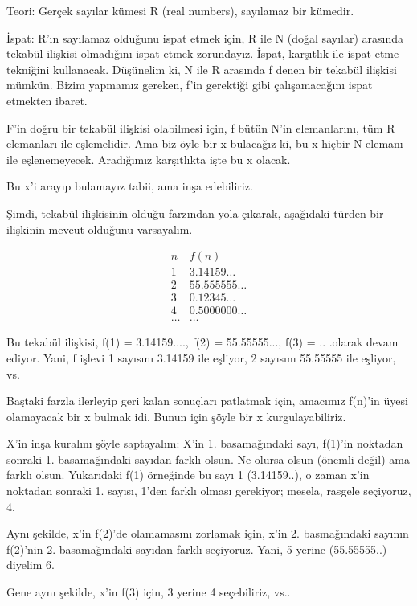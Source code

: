 \documentclass[12pt,fleqn]{article}\usepackage{../../common}
\begin{document}
Teori: Gerçek sayılar kümesi R (real numbers), sayılamaz bir kümedir.

İspat: R'ın sayılamaz olduğunu ispat etmek için, R ile N (doğal sayılar)
arasında tekabül ilişkisi olmadığını ispat etmek zorundayız. İspat,
karşıtlık ile ispat etme tekniğini kullanacak. Düşünelim ki, N ile R
arasında f denen bir tekabül ilişkisi mümkün. Bizim yapmamız gereken, f'in
gerektiği gibi çalışamacağını ispat etmekten ibaret.

F'in doğru bir tekabül ilişkisi olabilmesi için, f bütün N'in elemanlarını,
tüm R elemanları ile eşlemelidir. Ama biz öyle bir x bulacağız ki, bu x
hiçbir N elemanı ile eşlenemeyecek. Aradığımız karşıtlıkta işte bu x
olacak.

Bu x'i arayıp bulamayız tabii, ama inşa edebiliriz.

Şimdi, tekabül ilişkisinin olduğu farzından yola çıkarak, aşağıdaki türden
bir ilişkinin mevcut olduğunu varsayalım.

$$
\begin{array}{cc}
n & f(n) \\
\hline
1 &  3.14159 \dots \\
\hline
2 &  55.555555 \dots \\
\hline
3 &  0.12345 \dots \\
\hline
4 &  0.5000000 \dots \\
\hline
\dots & \dots 
\end{array}
$$

Bu tekabül ilişkisi, f(1) = 3.14159...., f(2) = 55.55555..., f(3) =
.. .olarak devam ediyor. Yani, f işlevi 1 sayısını 3.14159 ile eşliyor, 2
sayısını 55.55555 ile eşliyor, vs.

Baştaki farzla ilerleyip geri kalan sonuçları patlatmak için, amacımız
f(n)'in üyesi olamayacak bir x bulmak idi. Bunun için şöyle bir x
kurgulayabiliriz.

X'in inşa kuralını şöyle saptayalım: X'in 1. basamağındaki sayı, f(1)'in
noktadan sonraki 1. basamağındaki sayıdan farklı olsun. Ne olursa olsun
(önemli değil) ama farklı olsun. Yukarıdaki f(1) örneğinde bu sayı 1
(3.14159..), o zaman x'in noktadan sonraki 1. sayısı, 1'den farklı olması
gerekiyor; mesela, rasgele seçiyoruz, 4.

Aynı şekilde, x'in f(2)'de olamamasını zorlamak için, x'in 2. basmağındaki
sayının f(2)'nin 2. basamağındaki sayıdan farklı seçiyoruz. Yani, 5 yerine
(55.55555..) diyelim 6.

Gene aynı şekilde, x'in f(3) için, 3 yerine 4 seçebiliriz, vs..
\end{document}
